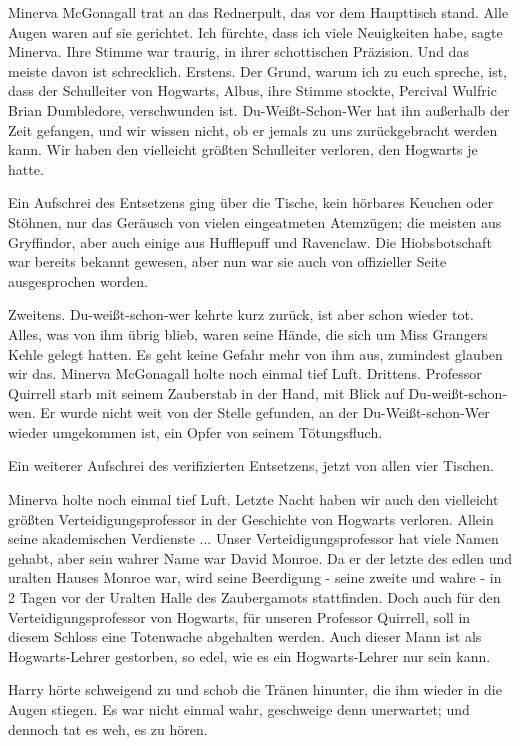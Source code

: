 Minerva McGonagall trat an das Rednerpult, das vor dem Haupttisch stand. Alle
Augen waren auf sie gerichtet. \glqq{}Ich fürchte, dass ich viele Neuigkeiten
habe\grqq{}, sagte Minerva. Ihre Stimme war traurig, in ihrer schottischen
Präzision. \glqq{}Und das meiste davon ist schrecklich. Erstens. Der Grund, warum
ich zu euch spreche, ist, dass der Schulleiter von Hogwarts, Albus\grqq{}, ihre
Stimme stockte, \glqq{}Percival Wulfric Brian Dumbledore, verschwunden ist.
Du-Weißt-Schon-Wer hat ihn außerhalb der Zeit gefangen, und wir wissen nicht, ob
er jemals zu uns zurückgebracht werden kann. Wir haben den vielleicht größten
Schulleiter verloren, den Hogwarts je hatte.\grqq{}

Ein Aufschrei des Entsetzens ging über die Tische, kein hörbares Keuchen oder
Stöhnen, nur das Geräusch von vielen eingeatmeten Atemzügen; die meisten aus
Gryffindor, aber auch einige aus Hufflepuff und Ravenclaw. Die Hiobsbotschaft
war bereits bekannt gewesen, aber nun war sie auch von offizieller Seite
ausgesprochen worden.

\glqq{}Zweitens. Du-weißt-schon-wer kehrte kurz zurück, ist aber schon wieder
tot. Alles, was von ihm übrig blieb, waren seine Hände, die sich um Miss
Grangers Kehle gelegt hatten. Es geht keine Gefahr mehr von ihm aus, zumindest
glauben wir das.\grqq{} Minerva McGonagall holte noch einmal tief Luft. \glqq{}
Drittens. Professor Quirrell starb mit seinem Zauberstab in der Hand, mit Blick
auf Du-weißt-schon-wen. Er wurde nicht weit von der Stelle gefunden, an der
Du-Weißt-schon-Wer wieder umgekommen ist, ein Opfer von seinem Tötungsfluch.\grqq{}

Ein weiterer Aufschrei des verifizierten Entsetzens, jetzt von allen vier
Tischen.

Minerva holte noch einmal tief Luft. \glqq{}Letzte Nacht haben wir auch den
vielleicht größten Verteidigungsprofessor in der Geschichte von Hogwarts
verloren. Allein seine akademischen Verdienste ... Unser Verteidigungsprofessor
hat viele Namen gehabt, aber sein wahrer Name war David Monroe. Da er der letzte
des edlen und uralten Hauses Monroe war, wird seine Beerdigung - seine zweite
und wahre - in 2 Tagen vor der Uralten Halle des Zaubergamots stattfinden. Doch
auch für den Verteidigungsprofessor von Hogwarts, für unseren Professor
Quirrell, soll in diesem Schloss eine Totenwache abgehalten werden. Auch dieser
Mann ist als Hogwarts-Lehrer gestorben, so edel, wie es ein Hogwarts-Lehrer nur
sein kann.\grqq{}

Harry hörte schweigend zu und schob die Tränen hinunter, die ihm wieder in die
Augen stiegen. Es war nicht einmal wahr, geschweige denn unerwartet; und dennoch
tat es weh, es zu hören.

